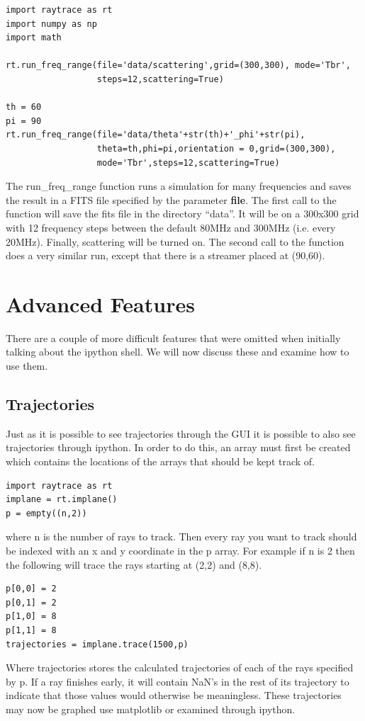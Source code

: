 \documentclass[12pt]{article}
\begin{document}
\begin{lstlisting}
import raytrace as rt
import numpy as np
import math

rt.run_freq_range(file='data/scattering',grid=(300,300), mode='Tbr',
                  steps=12,scattering=True)

th = 60
pi = 90
rt.run_freq_range(file='data/theta'+str(th)+'_phi'+str(pi),
                  theta=th,phi=pi,orientation = 0,grid=(300,300), 
                  mode='Tbr',steps=12,scattering=True)
\end{lstlisting}
The run\_freq\_range function runs a simulation for many frequencies
and saves the result in a FITS file specified by the parameter {\bf
  file}. The first call to the function will save the fits file in the
directory ``data''. It will be on a 300x300 grid with 12 frequency
steps between the default 80MHz and 300MHz (i.e. every
20MHz). Finally, scattering will be turned on. The second call to the
function does a very similar run, except that there is a streamer
placed at (90,60).


\section{Advanced Features}
\label{sec:6}
There are a couple of more difficult features that were omitted when
initially talking about the ipython shell. We will now discuss these
and examine how to use them.

\subsection{Trajectories}
Just as it is possible to see trajectories through the GUI it is
possible to also see trajectories through ipython. In order to do
this, an array must first be created which contains the locations of
the arrays that should be kept track of.

\begin{lstlisting}
import raytrace as rt
implane = rt.implane()
p = empty((n,2))
\end{lstlisting}
where n is the number of rays to track. Then every ray you want to
track should be indexed with an x and y coordinate in the p array. For
example if n is 2 then the following will trace the rays starting at
(2,2) and (8,8).

\begin{lstlisting}
p[0,0] = 2
p[0,1] = 2
p[1,0] = 8
p[1,1] = 8
trajectories = implane.trace(1500,p)
\end{lstlisting}
Where trajectories stores the calculated trajectories of each of the
rays specified by p. If a ray finishes early, it will contain NaN's in
the rest of its trajectory to indicate that those values would
otherwise be meaningless. These trajectories may now be graphed use matplotlib
or examined through ipython.
\end{document}
